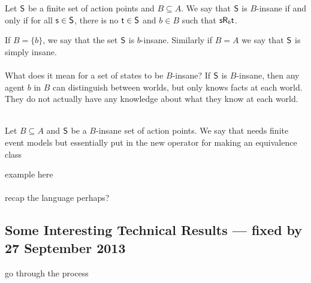 \begin{defn} \label{binsane}
	Let $\mathrm{\mathsf{S}}$ be a finite set of action points and $B \subseteq A$.
	We say that $\mathrm{\mathsf{S}}$ is $B$-insane if and only if for all $\mathrm{\mathsf{s}} \in \mathrm{\mathsf{S}}$, there is no $\mathrm{\mathsf{t}} \in
\mathrm{\mathsf{S}}$ and $b
\in B$ such that $\mathrm{\mathsf{s}} \mathrm{\mathsf{R}}_b \mathrm{\mathsf{t}}$.
\end{defn}

If $B = \{b\}$, we say that the set $\mathrm{\mathsf{S}}$ is $b$-insane.
Similarly if $B = A$ we say that $\mathrm{\mathsf{S}}$ is simply insane.\\
\\
What does it mean for a set of states to be $B$-insane?
If $\mathrm{\mathsf{S}}$ is $B$-insane, then any agent $b$ in $B$ can distinguish between worlds, but only knows
facts at each world.
They do not actually have any knowledge about what they know at each world.\\
\\
\begin{defn} \label{makeEquivalence}
	Let $B \subseteq A$ and $\mathrm{\mathsf{S}}$ be a $B$-insane set of action points.
	We say that \FIXME needs finite event models but essentially put in the new operator for making an
equivalence class
\end{defn}

\FIXME example here\\
\\
\FIXME recap the language perhaps?

\subsection{Some Interesting Technical Results --- fixed by 27 September 2013}

\FIXME go through the process
